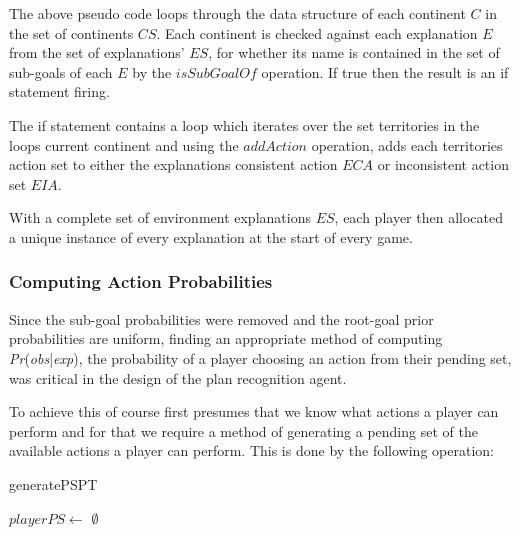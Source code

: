 \documentclass[parskip]{cs4rep}
\begin{document}
The above pseudo code loops through the data structure of each continent $C$ in the set of continents $CS$. Each continent is checked against each explanation $E$ from the set of explanations' $ES$, for whether its name is contained in the set of sub-goals of each $E$ by the $isSubGoalOf$ operation. If true then the result is an if statement firing. 

The if statement contains a loop which iterates over the set territories in the loops current continent and using the $addAction$ operation, adds each territories action set to either the explanations consistent action $ECA$ or inconsistent action set $EIA$.

With a complete set of environment explanations $ES$, each player then allocated a unique instance of every explanation at the start of every game. 

\subsubsection{Computing Action Probabilities}

Since the sub-goal probabilities were removed and the root-goal prior probabilities are uniform, finding an appropriate method of computing \textit{Pr}(\textit{obs}|\textit{exp}), the probability of a player choosing an action from their pending set, was critical in the design of the plan recognition agent. 

To achieve this of course first presumes that we know what actions a player can perform and for that we require a method of generating a pending set of the available actions a player can perform. This is done by the following operation:

\begin{pseudocode}[ruled]{generatePS}{PT}
\begin{algorithm}[H]

$playerPS \gets $ $\emptyset$

\end{algorithm}
\end{pseudocode}
\end{document}
